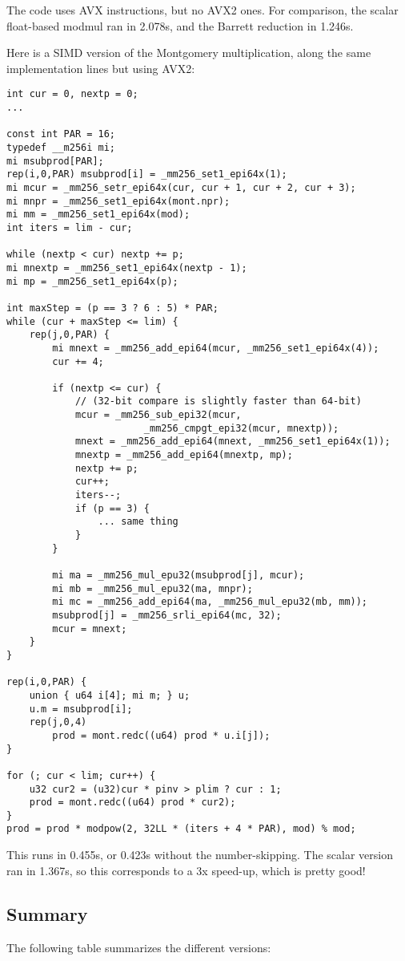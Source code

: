 The code uses AVX instructions, but no AVX2 ones.
For comparison, the scalar float-based modmul ran in 2.078s, and the Barrett reduction in 1.246s.

Here is a SIMD version of the Montgomery multiplication, along the same implementation lines but using AVX2:
\begin{lstlisting}
int cur = 0, nextp = 0;
...

const int PAR = 16;
typedef __m256i mi;
mi msubprod[PAR];
rep(i,0,PAR) msubprod[i] = _mm256_set1_epi64x(1);
mi mcur = _mm256_setr_epi64x(cur, cur + 1, cur + 2, cur + 3);
mi mnpr = _mm256_set1_epi64x(mont.npr);
mi mm = _mm256_set1_epi64x(mod);
int iters = lim - cur;

while (nextp < cur) nextp += p;
mi mnextp = _mm256_set1_epi64x(nextp - 1);
mi mp = _mm256_set1_epi64x(p);

int maxStep = (p == 3 ? 6 : 5) * PAR;
while (cur + maxStep <= lim) {
	rep(j,0,PAR) {
		mi mnext = _mm256_add_epi64(mcur, _mm256_set1_epi64x(4));
		cur += 4;

		if (nextp <= cur) {
			// (32-bit compare is slightly faster than 64-bit)
			mcur = _mm256_sub_epi32(mcur,
			            _mm256_cmpgt_epi32(mcur, mnextp));
			mnext = _mm256_add_epi64(mnext, _mm256_set1_epi64x(1));
			mnextp = _mm256_add_epi64(mnextp, mp);
			nextp += p;
			cur++;
			iters--;
			if (p == 3) {
				... same thing
			}
		}

		mi ma = _mm256_mul_epu32(msubprod[j], mcur);
		mi mb = _mm256_mul_epu32(ma, mnpr);
		mi mc = _mm256_add_epi64(ma, _mm256_mul_epu32(mb, mm));
		msubprod[j] = _mm256_srli_epi64(mc, 32);
		mcur = mnext;
	}
}

rep(i,0,PAR) {
	union { u64 i[4]; mi m; } u;
	u.m = msubprod[i];
	rep(j,0,4)
		prod = mont.redc((u64) prod * u.i[j]);
}

for (; cur < lim; cur++) {
	u32 cur2 = (u32)cur * pinv > plim ? cur : 1;
	prod = mont.redc((u64) prod * cur2);
}
prod = prod * modpow(2, 32LL * (iters + 4 * PAR), mod) % mod;
\end{lstlisting}

This runs in 0.455s, or 0.423s without the number-skipping.
The scalar version ran in 1.367s, so this corresponds to a 3x speed-up, which is pretty good!

\subsection{Summary}
The following table summarizes the different versions:

